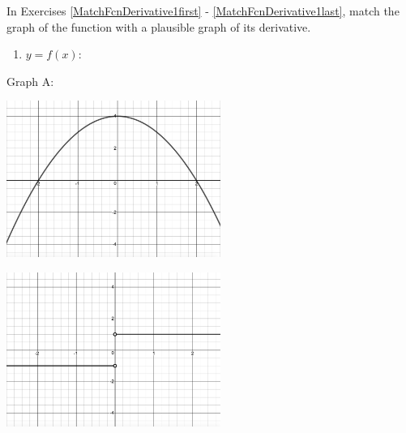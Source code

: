 In Exercises \ref{MatchFcnDerivative1first} - \ref{MatchFcnDerivative1last}, match the graph of the function with a plausible graph of its derivative.

\begin{center}

\begin{multicols}{2}

\begin{enumerate}
\setcounter{enumi}{\value{HW}}

\item \label{MatchFcnDerivative1first}$y = f(x)$:

\setcounter{HW}{\value{enumi}}
\end{enumerate}

Graph A:

\end{multicols}


\begin{multicols}{2}

\includegraphics[width=2.75in]{./IntroductiontoDerivativesGraphics/MatchFunc01.jpeg}

\includegraphics[width=2.75in]{./IntroductiontoDerivativesGraphics/MatchDeriv03.jpeg}

\end{multicols}



\begin{multicols}{2}

\begin{enumerate}
\setcounter{enumi}{\value{HW}}


\end{enumerate}
\end{multicols}
\end{center}
